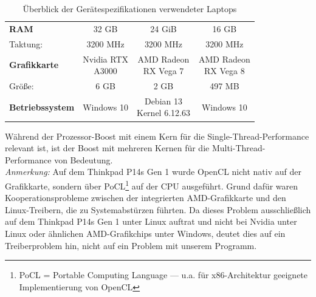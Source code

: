 \begin{table}[h]
\begin{tabular}{@{}lccc@{}}
    \textbf{RAM}             & 32 GB                                       & 24 GiB                                 & 16 GB                               \\ 
    Taktung:                 & 3200 MHz                                    & 3200 MHz                               & 3200 MHz                   
    \vspace{3mm}  \\ %
    \textbf{Grafikkarte}     & \makecell{Nvidia RTX \\ A3000}              & \makecell{AMD Radeon \\ RX Vega 7}     & \makecell{AMD Radeon \\ RX Vega 8}  \\ 
    Größe:                   & 6 GB                                        & 2 GB                                   & 497 MB                     
    \vspace{3mm} \\ %
    \textbf{Betriebssystem}  & Windows 10                                  & \makecell{Debian 13 \\ Kernel 6.12.63} & Windows 10                          \\ 
    \bottomrule
\end{tabular}
    \caption{Überblick der Gerätespezifikationen verwendeter Laptops}
\end{table}
\noindent
Während der Prozessor-Boost mit einem Kern für die Single-Thread-Performance relevant ist, ist der Boost mit mehreren Kernen 
für die Multi-Thread-Performance von Bedeutung.
\vspace{0.25cm}\\
\noindent
\textit{Anmerkung:} Auf dem Thinkpad P14s Gen 1 wurde OpenCL nicht nativ auf der Grafikkarte, sondern über PoCL\footnote{PoCL = Portable Computing Language --- 
u.a. für x86-Architektur geeignete Implementierung von OpenCL} auf der CPU ausgeführt. Grund dafür waren Kooperationsprobleme zwischen der integrierten 
AMD-Grafikkarte und den Linux-Treibern, die zu Systemabstürzen führten. Da dieses Problem ausschließlich auf dem Thinkpad P14s Gen 1 unter Linux auftrat und nicht
bei Nvidia unter Linux oder ähnlichen AMD-Grafikchips unter Windows, deutet dies auf ein Treiberproblem hin, nicht auf ein Problem mit unserem Programm.

